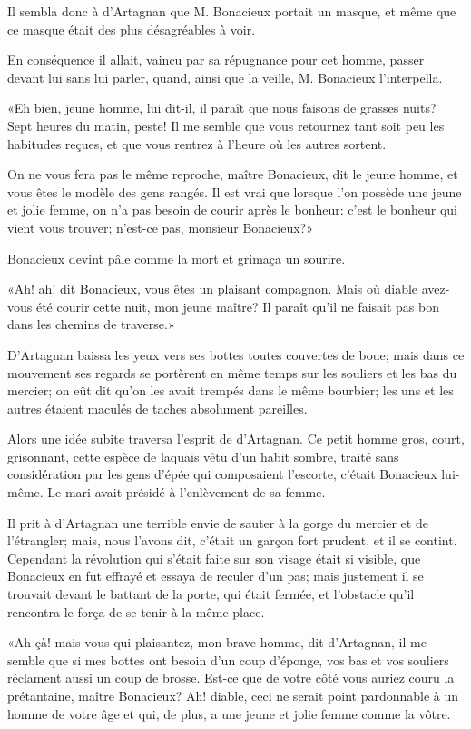 Il sembla donc à d'Artagnan que M. Bonacieux portait un masque, et même que ce masque était des plus désagréables à voir. 

En conséquence il allait, vaincu par sa répugnance pour cet homme, passer devant lui sans lui parler, quand, ainsi que la veille, M. Bonacieux l'interpella. 

«Eh bien, jeune homme, lui dit-il, il paraît que nous faisons de grasses nuits? Sept heures du matin, peste! Il me semble que vous retournez tant soit peu les habitudes reçues, et que vous rentrez à l'heure où les autres sortent. 

\speak  On ne vous fera pas le même reproche, maître Bonacieux, dit le jeune homme, et vous êtes le modèle des gens rangés. Il est vrai que lorsque l'on possède une jeune et jolie femme, on n'a pas besoin de courir après le bonheur: c'est le bonheur qui vient vous trouver; n'est-ce pas, monsieur Bonacieux?» 

Bonacieux devint pâle comme la mort et grimaça un sourire. 

«Ah! ah! dit Bonacieux, vous êtes un plaisant compagnon. Mais où diable avez-vous été courir cette nuit, mon jeune maître? Il paraît qu'il ne faisait pas bon dans les chemins de traverse.» 

D'Artagnan baissa les yeux vers ses bottes toutes couvertes de boue; mais dans ce mouvement ses regards se portèrent en même temps sur les souliers et les bas du mercier; on eût dit qu'on les avait trempés dans le même bourbier; les uns et les autres étaient maculés de taches absolument pareilles. 

Alors une idée subite traversa l'esprit de d'Artagnan. Ce petit homme gros, court, grisonnant, cette espèce de laquais vêtu d'un habit sombre, traité sans considération par les gens d'épée qui composaient l'escorte, c'était Bonacieux lui-même. Le mari avait présidé à l'enlèvement de sa femme. 

Il prit à d'Artagnan une terrible envie de sauter à la gorge du mercier et de l'étrangler; mais, nous l'avons dit, c'était un garçon fort prudent, et il se contint. Cependant la révolution qui s'était faite sur son visage était si visible, que Bonacieux en fut effrayé et essaya de reculer d'un pas; mais justement il se trouvait devant le battant de la porte, qui était fermée, et l'obstacle qu'il rencontra le força de se tenir à la même place. 

«Ah çà! mais vous qui plaisantez, mon brave homme, dit d'Artagnan, il me semble que si mes bottes ont besoin d'un coup d'éponge, vos bas et vos souliers réclament aussi un coup de brosse. Est-ce que de votre côté vous auriez couru la prétantaine, maître Bonacieux? Ah! diable, ceci ne serait point pardonnable à un homme de votre âge et qui, de plus, a une jeune et jolie femme comme la vôtre. 

